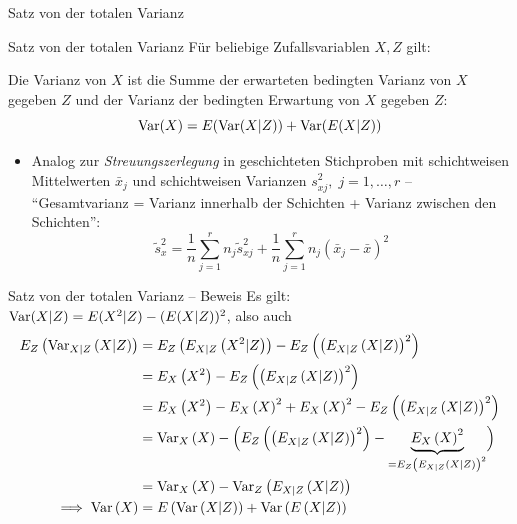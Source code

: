 \documentclass[
  10pt,
  ignorenonframetext,
]{beamer}
\providecommand{\tightlist}{%
  \setlength{\itemsep}{0pt}\setlength{\parskip}{0pt}}
\begin{document}
\begin{frame}{Satz von der totalen Varianz}
\protect\hypertarget{satz-von-der-totalen-varianz}{}
\begin{block}{Satz von der totalen Varianz}
\protect\hypertarget{satz-von-der-totalen-varianz-1}{}
Für beliebige Zufallsvariablen \(X, Z\) gilt:

Die Varianz von \(X\) ist die Summe der erwarteten bedingten Varianz von
\(X\) gegeben \(Z\) und der Varianz der bedingten Erwartung von \(X\)
gegeben \(Z\): \[\operatorname{Var}(X) = E(\operatorname{Var}(X|Z)) + \operatorname{Var}(E(X|Z))\]
\end{block}

\begin{itemize}
\tightlist
\item
  Analog zur \emph{Streuungszerlegung} in geschichteten Stichproben mit
  schichtweisen Mittelwerten \(\bar x_j\) und schichtweisen Varianzen
  \(s_{xj}^2, \; j=1,\dots,r\) --\\
  ``Gesamtvarianz = Varianz innerhalb der Schichten + Varianz zwischen
  den Schichten'':
  \[\widetilde s_x^2 = \frac{1}{n} \sum_{j=1}^r n_j \widetilde s_{xj}^2 + \frac{1}{n} \sum_{j=1}^r n_j(\bar x_j - \bar x)^2\]
\end{itemize}
\end{frame}

\begin{frame}{Satz von der totalen Varianz -- Beweis}
\protect\hypertarget{satz-von-der-totalen-varianz-beweis}{}
Es gilt: \(\operatorname{Var}(X|Z) = E(X^2|Z) - (E(X|Z))^2\), also auch \begin{align*}
E_Z\left(\operatorname{Var}_{X|Z}\left(X|Z\right)\right) &= E_Z\left(E_{X|Z}\left(X^2|Z\right)\right) - E_Z\left(\left(E_{X|Z}\left(X|Z\right)\right)^2\right) \\ 
  &= E_X\left(X^2\right) - E_Z\left(\left(E_{X|Z}\left(X|Z\right)\right)^2\right) \\
  &=  E_X\left(X^2\right) - E_X\left(X\right)^2 + E_X\left(X\right)^2 - E_Z\left(\left(E_{X|Z}\left(X|Z\right)\right)^2\right) \\
  &= \operatorname{Var}_X\left(X\right) - \Bigl(E_Z\left(\left(E_{X|Z}\left(X|Z\right)\right)^2\right) - \underbrace{E_X\left(X\right)^2}_{= E_Z\left(E_{X|Z}\left(X|Z\right)\right)^2}\Bigr) \\
  &= \operatorname{Var}_X\left(X\right) - \operatorname{Var}_Z\left(E_{X|Z}\left(X|Z\right)\right) \\
\implies \operatorname{Var}\left(X\right) &= E\left(\operatorname{Var}\left(X|Z\right)\right) + \operatorname{Var}\left(E\left(X|Z\right)\right)
\end{align*}
\end{frame}
\end{document}
